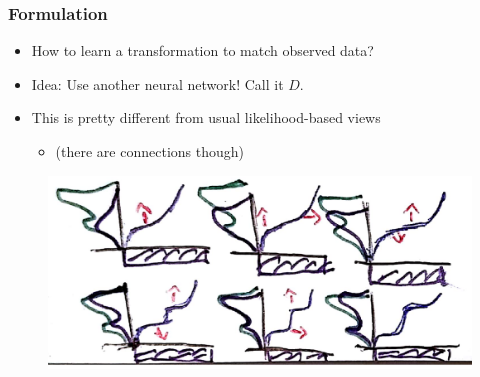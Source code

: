 \documentclass[10pt,mathserif]{beamer}
\begin{document}
\begin{frame}
  \frametitle{Formulation}
 \begin{itemize}
 \item How to learn a transformation to match observed data?
 \item Idea: Use another neural network! Call it $D$.
 \item This is pretty different from usual likelihood-based views
   \begin{itemize}
   \item (there are connections though)
   \end{itemize}
 \end{itemize}
\begin{figure}[ht]
  \centering
  \includegraphics[width=0.7\paperwidth]{figure/discriminator_transformation}
  \caption{\label{fig:discriminator_transformation} }
\end{figure}
\end{frame}
\end{document}
